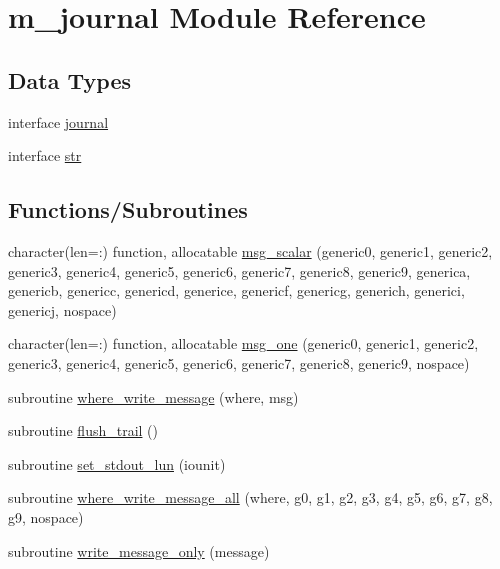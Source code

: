 \hypertarget{namespacem__journal}{}\section{m\+\_\+journal Module Reference}
\label{namespacem__journal}
\subsection*{Data Types}
\begin{DoxyCompactItemize}
\item 
interface \mbox{\hyperlink{interfacem__journal_1_1journal}{journal}}
\item 
interface \mbox{\hyperlink{interfacem__journal_1_1str}{str}}
\end{DoxyCompactItemize}
\subsection*{Functions/\+Subroutines}
\begin{DoxyCompactItemize}
\item 
character(len=\+:) function, allocatable \mbox{\hyperlink{namespacem__journal_a7906bba242b412d6941f4b32233b7eca}{msg\+\_\+scalar}} (generic0, generic1, generic2, generic3, generic4, generic5, generic6, generic7, generic8, generic9, generica, genericb, genericc, genericd, generice, genericf, genericg, generich, generici, genericj, nospace)
\item 
character(len=\+:) function, allocatable \mbox{\hyperlink{namespacem__journal_a1b516ae6ba2da17e10847cf68d6833b1}{msg\+\_\+one}} (generic0, generic1, generic2, generic3, generic4, generic5, generic6, generic7, generic8, generic9, nospace)
\item 
subroutine \mbox{\hyperlink{namespacem__journal_a21238c3fc7731703c75eb39233ab529e}{where\+\_\+write\+\_\+message}} (where, msg)
\item 
subroutine \mbox{\hyperlink{namespacem__journal_a24b891eded8ca585a6a72ab0eef7016c}{flush\+\_\+trail}} ()
\item 
subroutine \mbox{\hyperlink{namespacem__journal_a8388800481a5e7ca022b52cfc56b9daf}{set\+\_\+stdout\+\_\+lun}} (iounit)
\item 
subroutine \mbox{\hyperlink{namespacem__journal_a25d0f5da7f7e84e22ab0a583447412b1}{where\+\_\+write\+\_\+message\+\_\+all}} (where, g0, g1, g2, g3, g4, g5, g6, g7, g8, g9, nospace)
\item 
subroutine \mbox{\hyperlink{namespacem__journal_aa86511a7c388f9286c282f6fa933ab58}{write\+\_\+message\+\_\+only}} (message)
\end{DoxyCompactItemize}

